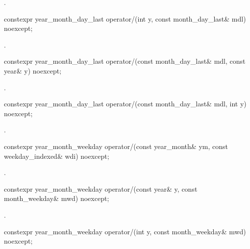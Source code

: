 \begin{itemdescr}
\pnum
\returns
{}.
\end{itemdescr}

\begin{itemdecl}
constexpr year_month_day_last
  operator/(int y, const month_day_last& mdl) noexcept;
\end{itemdecl}

\begin{itemdescr}
\pnum
\returns
{}.
\end{itemdescr}

\begin{itemdecl}
constexpr year_month_day_last
  operator/(const month_day_last& mdl, const year& y) noexcept;
\end{itemdecl}

\begin{itemdescr}
\pnum
\returns
{}.
\end{itemdescr}

\begin{itemdecl}
constexpr year_month_day_last
  operator/(const month_day_last& mdl, int y) noexcept;
\end{itemdecl}

\begin{itemdescr}
\pnum
\returns
{}.
\end{itemdescr}

\begin{itemdecl}
constexpr year_month_weekday
  operator/(const year_month& ym, const weekday_indexed& wdi) noexcept;
\end{itemdecl}

\begin{itemdescr}
\pnum
\returns
{}.
\end{itemdescr}

\begin{itemdecl}
constexpr year_month_weekday
  operator/(const year& y, const month_weekday& mwd) noexcept;
\end{itemdecl}

\begin{itemdescr}
\pnum
\returns
{}.
\end{itemdescr}

\begin{itemdecl}
constexpr year_month_weekday
  operator/(int y, const month_weekday& mwd) noexcept;
\end{itemdecl}


